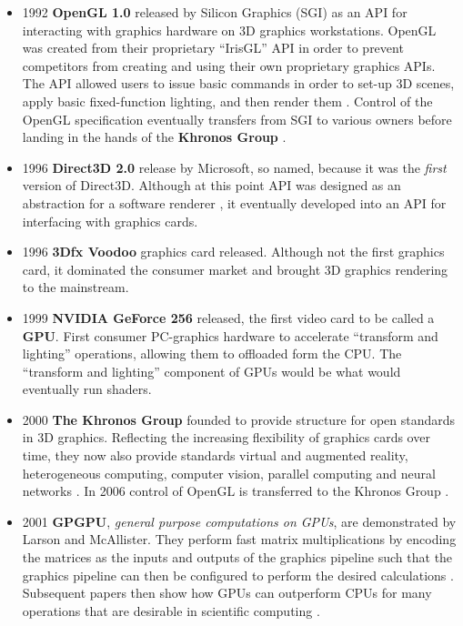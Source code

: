 \documentclass[a4paper,12pt,twoside,openright]{report}
\begin{document}
\begin{itemize}

\item 1992 \textbf{OpenGL 1.0} released by Silicon Graphics (SGI) as an API for
interacting with graphics hardware on 3D graphics workstations. OpenGL was
created from their proprietary ``IrisGL'' API in order to prevent competitors
from creating and using their own proprietary graphics APIs. The API allowed
users to issue basic commands in order to set-up 3D scenes, apply basic
fixed-function lighting, and then render them \cite{OpenGL_1_0}. Control of the
OpenGL specification eventually transfers from SGI to various owners before
landing in the hands of the \textbf{Khronos Group} \cite{OpenCL}. \\

\item 1996 \textbf{Direct3D 2.0} release by Microsoft, so named, because it was
the \textit{first} version of Direct3D. Although at this point API was designed
as an abstraction for a software renderer
\cite{JohnCarmackPlanDirect3DvsOpenGl}, it eventually developed into an API for
interfacing with graphics cards. \\

\item 1996 \textbf{3Dfx Voodoo} graphics card released. Although not the first
graphics card, it dominated the consumer market and brought 3D graphics
rendering to the mainstream. \cite{TODO} \\

\item 1999 \textbf{NVIDIA GeForce 256} released, the first video card to be
called a \textbf{GPU}. First consumer PC-graphics hardware to accelerate
``transform and lighting'' operations, allowing them to offloaded form the CPU.
The ``transform and lighting'' component of GPUs would be what would eventually
run shaders. \cite{GeForce256} \\

\item 2000 \textbf{The Khronos Group} founded to provide structure for open
standards in 3D graphics. Reflecting the increasing flexibility of graphics
cards over time, they now also provide standards virtual and augmented reality,
heterogeneous computing, computer vision, parallel computing and neural
networks \cite{KhronosGroupAbout}. In 2006 control of OpenGL is transferred to
the Khronos Group \cite{OpenGLToKhronos}. \\

\item 2001 \textbf{GPGPU}, \textit{general purpose computations on GPUs}, are
demonstrated by Larson and McAllister. They perform fast matrix multiplications
by encoding the matrices as the inputs and outputs of the graphics pipeline
such that the graphics pipeline can then be configured to perform the desired
calculations \cite{MatrixGPU}. Subsequent papers then show how GPUs can
outperform CPUs for many operations that are desirable in scientific computing
\cite{CUDAtoOpenCL} \cite{Kruger03linearalgebra} \cite{LUGPU}
\cite{SparsematrixGPU}. \\


\end{itemize}
\end{document}
